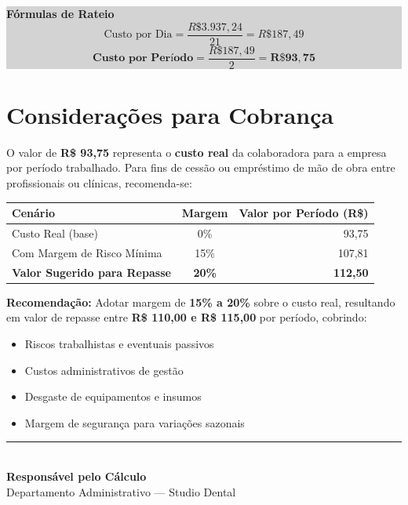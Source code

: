 \documentclass[12pt, a4paper]{article}
\newcommand{\reais}[1]{R\$ #1}
\begin{document}
\colorbox{lightGray}{%
    \parbox{\textwidth}{%
        \vspace{0.5cm}
        \centering
        {\large \textbf{Fórmulas de Rateio}} \\
        \vspace{0.5cm}
        \[ \text{Custo por Dia} = \frac{\reais{3.937,24}}{21} = \reais{187,49} \]
        \vspace{0.3cm}
        \[ \boxed{\textbf{Custo por Período} = \frac{\reais{187,49}}{2} = \mathbf{\reais{93,75}}} \]
        \vspace{0.3cm}
    }%
}

\section{Considerações para Cobrança}

O valor de \textbf{\reais{93,75}} representa o \textbf{custo real} da colaboradora para a empresa por período trabalhado. Para fins de cessão ou empréstimo de mão de obra entre profissionais ou clínicas, recomenda-se:

\begin{table}[H]
    \centering
    \renewcommand{\arraystretch}{1.5}
    \begin{tabularx}{\textwidth}{X c r}
        \toprule
        \rowcolor{tableHeader} \textbf{Cenário} & \textbf{Margem} & \textbf{Valor por Período (R\$)} \\
        \midrule
        Custo Real (base) & 0\% & 93,75 \\
        \rowcolor{lightGray}
        Com Margem de Risco Mínima & 15\% & 107,81 \\
        \textcolor{successGreen}{\textbf{Valor Sugerido para Repasse}} & \textcolor{successGreen}{\textbf{20\%}} & \textcolor{successGreen}{\textbf{112,50}} \\
        \bottomrule
    \end{tabularx}
\end{table}

\newpage
\textcolor{accentColor}{\textbf{Recomendação:}} Adotar margem de \textbf{15\% a 20\%} sobre o custo real, resultando em valor de repasse entre \textbf{\reais{110,00} e \reais{115,00}} por período, cobrindo:

\begin{itemize}
    \item Riscos trabalhistas e eventuais passivos
    \item Custos administrativos de gestão
    \item Desgaste de equipamentos e insumos
    \item Margem de segurança para variações sazonais
\end{itemize}

\vspace{2cm}

\begin{center}
    \rule{8cm}{0.5pt} \\
    \vspace{0.3cm}
    \textbf{Responsável pelo Cálculo} \\
    \textcolor{secondaryText}{\small Departamento Administrativo --- Studio Dental}
\end{center}
\end{document}
